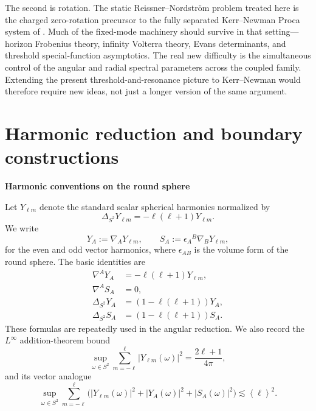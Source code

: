 \documentclass[12pt]{article}
\numberwithin{equation}{section}
\theoremstyle{plain}
\theoremstyle{definition}
\theoremstyle{remark}
\newcommand{\angles}[1]{\left\langle #1 \right\rangle}
\newcommand{\abs}[1]{\left|#1\right|}
\newcommand{\appheading}[1]{\par\medskip\noindent\textbf{#1}\par\smallskip\noindent}
\begin{document}
The second is rotation.  The static Reissner--Nordstr\"om problem treated here is the charged zero-rotation precursor to the fully separated Kerr--Newman Proca system of \cite{CayusoDiasGrayKubiznakMargalitSantosSouzaThiele2020}.  Much of the fixed-mode machinery should survive in that setting---horizon Frobenius theory, infinity Volterra theory, Evans determinants, and threshold special-function asymptotics.  The real new difficulty is the simultaneous control of the angular and radial spectral parameters across the coupled family.  Extending the present threshold-and-resonance picture to Kerr--Newman would therefore require new ideas, not just a longer version of the same argument.


\appendix

\appendix

\section{Harmonic reduction and boundary constructions}\label{app:vsh}
\appheading{Harmonic conventions on the round sphere}

Let $Y_{\ell m}$ denote the standard scalar spherical harmonics normalized by
\[
   \Delta_{S^2}Y_{\ell m}=-\ell(\ell+1)Y_{\ell m}.
\]
We write
\[
   Y_A:=\nabla_A Y_{\ell m},
   \qquad
   S_A:=\epsilon_A{}^{B}\nabla_B Y_{\ell m},
\]
for the even and odd vector harmonics, where $\epsilon_{AB}$ is the volume form of the round sphere.  The basic identities are
\begin{align}
   \nabla^A Y_A&=-\ell(\ell+1)Y_{\ell m},\label{eq:app_sph_id_1}\\
   \nabla^A S_A&=0,\label{eq:app_sph_id_2}\\
   \Delta_{S^2}Y_A&=(1-\ell(\ell+1))Y_A,\label{eq:app_sph_id_3}\\
   \Delta_{S^2}S_A&=(1-\ell(\ell+1))S_A.\label{eq:app_sph_id_4}
\end{align}
These formulas are repeatedly used in the angular reduction.  We also record the $L^\infty$ addition-theorem bound
\begin{equation}\label{eq:app_addition_scalar}
   \sup_{\omega\in S^2}\sum_{m=-\ell}^{\ell}\abs{Y_{\ell m}(\omega)}^2
   =\frac{2\ell+1}{4\pi},
\end{equation}
and its vector analogue
\begin{equation}\label{eq:app_addition_vector}
   \sup_{\omega\in S^2}\sum_{m=-\ell}^{\ell}
      \bigl(\abs{Y_{\ell m}(\omega)}^2+\abs{Y_A(\omega)}^2+\abs{S_A(\omega)}^2\bigr)
   \lesssim \angles{\ell}^{2}.
\end{equation}
\end{document}
